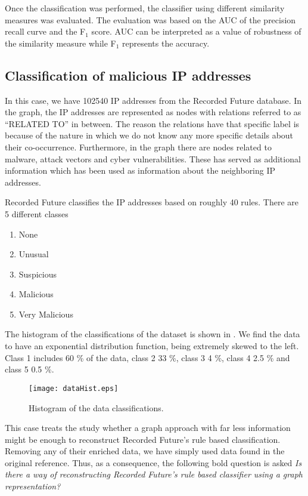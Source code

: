 Once the classification was performed, the classifier using different similarity measures was evaluated. The evaluation was based on the AUC of the precision recall curve and the F$_1$ score. AUC can be interpreted as a value of robustness of the similarity measure while F$_1$ represents the accuracy.

\subsection{Classification of malicious IP addresses}
In this case, we have 102540 IP addresses from the Recorded Future database. In the graph, the IP addresses are represented as nodes with relations referred to as ``RELATED TO'' in between. The reason the relations have that specific label is because of the nature in which we do not know any more specific details about their co-occurrence. Furthermore, in the graph there are nodes related to malware, attack vectors and cyber vulnerabilities. These has served as additional information which has been used as information about the neighboring IP addresses.

Recorded Future classifies the IP addresses based on roughly 40 rules. There are 5 different classes
\begin{enumerate}
    \item None
    \item Unusual
    \item Suspicious
    \item Malicious
    \item Very Malicious
\end{enumerate}

The histogram of the classifications of the dataset is shown in . We find the data to have an exponential distribution function, being extremely skewed to the left. Class 1 includes 60 \% of the data, class 2 33 \%, class 3 4 \%, class 4 2.5 \% and class 5 0.5 \%. 

\begin{figure}[h!]
    \centering
    \texttt{[image: dataHist.eps]}
    \caption{Histogram of the data classifications.}
    \label{hist}
\end{figure}

This case treats the study whether a graph approach with far less information might be enough to reconstruct Recorded Future's rule based classification. Removing any of their enriched data, we have simply used data found in the original reference. Thus, as a consequence, the following bold question is asked \textit{Is there a way of reconstructing Recorded Future's rule based classifier using a graph representation?} 

